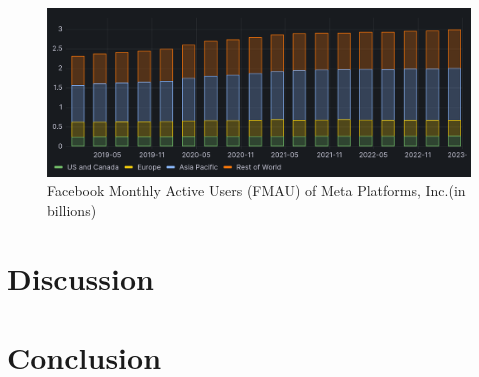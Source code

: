 \documentclass[12pt, a4paper]{article}
\begin{document}
\begin{figure}[h]
    \centering
    \includegraphics[width=1.00\textwidth]{facebook-mau}
    \caption{Facebook Monthly Active Users (FMAU) of Meta Platforms, Inc.(in
    billions)\cite{2023q1,2021q2Slides,2019q4Slides}}
    \label{fig:facebook-mau}
\end{figure}

\section*{Discussion}






\section*{Conclusion}




\end{document}
